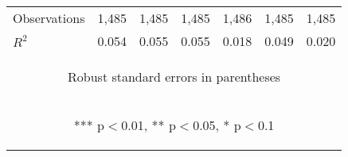 \begin{center}
\begin{tabular}{lcccccc}
Observations & 1,485 & 1,485 & 1,485 & 1,486 & 1,485 & 1,485 \\
 $R^2$ & 0.054 & 0.055 & 0.055 & 0.018 & 0.049 & 0.020 \\ \hline
\multicolumn{7}{c}{\begin{footnotesize} Robust standard errors in parentheses\end{footnotesize}} \\
\multicolumn{7}{c}{\begin{footnotesize} *** p$<$0.01, ** p$<$0.05, * p$<$0.1\end{footnotesize}} \\
\end{tabular}
\end{center}
